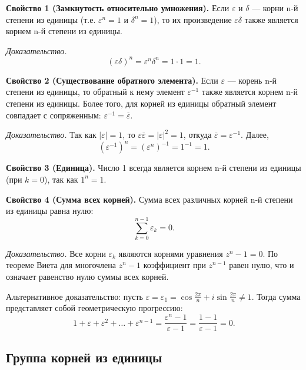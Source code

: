 \documentclass[a4paper,12pt]{article}
\theoremstyle{definition}
\theoremstyle{plain}
\theoremstyle{remark}
\begin{document}
	\begin{tcolorbox}[colback=green!5, colframe=green!50!black, title=Основные свойства]
		
		\textbf{Свойство 1 (Замкнутость относительно умножения).} 
		Если \( \varepsilon \) и \( \delta \) — корни n-й степени из единицы (т.е. \( \varepsilon^n = 1 \) и \( \delta^n = 1 \)), то их произведение \( \varepsilon \delta \) также является корнем n-й степени из единицы.
		
		\textit{Доказательство.} 
		\[
		(\varepsilon \delta)^n = \varepsilon^n \delta^n = 1 \cdot 1 = 1.
		\]
		
		\medskip
		\textbf{Свойство 2 (Существование обратного элемента).}
		Если \( \varepsilon \) — корень n-й степени из единицы, то обратный к нему элемент \( \varepsilon^{-1} \) также является корнем n-й степени из единицы. Более того, для корней из единицы обратный элемент совпадает с сопряженным: \( \varepsilon^{-1} = \overline{\varepsilon} \).
		
		\textit{Доказательство.} 
		Так как \( |\varepsilon| = 1 \), то \( \varepsilon \overline{\varepsilon} = |\varepsilon|^2 = 1 \), откуда \( \overline{\varepsilon} = \varepsilon^{-1} \). Далее,
		\[
		(\varepsilon^{-1})^n = (\varepsilon^n)^{-1} = 1^{-1} = 1.
		\]
		
		\medskip
		\textbf{Свойство 3 (Единица).}
		Число 1 всегда является корнем n-й степени из единицы (при \( k = 0 \)), так как \( 1^n = 1 \).
		
		\medskip
		\textbf{Свойство 4 (Сумма всех корней).}
		Сумма всех различных корней n-й степени из единицы равна нулю:
		\[
		\sum_{k=0}^{n-1} \varepsilon_k = 0.
		\]
		
		\textit{Доказательство.} 
		Все корни \( \varepsilon_k \) являются корнями уравнения \( z^n - 1 = 0 \). По теореме Виета для многочлена \( z^n - 1 \) коэффициент при \( z^{n-1} \) равен нулю, что и означает равенство нулю суммы всех корней.
		
		Альтернативное доказательство: пусть \( \varepsilon = \varepsilon_1 = \cos \frac{2\pi}{n} + i \sin \frac{2\pi}{n} \neq 1 \). Тогда сумма представляет собой геометрическую прогрессию:
		\[
		1 + \varepsilon + \varepsilon^2 + \dots + \varepsilon^{n-1} = \frac{\varepsilon^n - 1}{\varepsilon - 1} = \frac{1 - 1}{\varepsilon - 1} = 0.
		\]
		
	\end{tcolorbox}
	
	\subsection{Группа корней из единицы}
	
\end{document}

